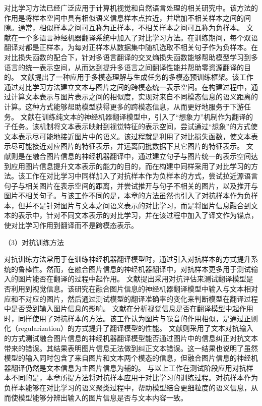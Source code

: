对比学习方法已经广泛应用于计算机视觉和自然语言处理的相关研究中。该方法的作用是将样本空间中具有相似语义信息样本点拉近，并增加不相关样本之间的间隙。通常，相似样本之间可互称为正样本，不相关样本之间可互称为负样本。
文献\cite{70_pan-etal-2021-contrastive}在一个多语言神经机器翻译系统中加入了对比学习方法。在训练期间，每个双语翻译对都是正样本，为每对正样本从数据集中随机选取不相关句子作为负样本。在对比损失函数的配合下，针对多语言翻译的交叉熵损失函数能够帮助模型学习到多语言的统一表示空间，从而达到提升多语言之间翻译性能并帮助零资源翻译的目的。
文献\cite{80_li-etal-2021-unimo}提出了一种应用于多模态理解与生成任务的多模态预训练框架。该工作通过对比学习方法建立文本与图片之间的跨模态统一表示空间。在构建过程中，通过计算文本表示与图片表示之间的相似度，实现对来自不同模态信息的语义距离的计算。这种方式能够帮助模型获得更多的跨模态信息，从而更好地服务于下游任务。
文献\cite{37_elliott-kadar-2017-imagination}在训练纯文本的神经机器翻译模型中，引入了“想象力”机制作为翻译的子任务。该机制将文本表示映射到视觉特征的表示空间，尝试通过“想象”的方式使文本表示尽可能地接近图片中的语义。该过程就是利用了对比损失函数，使文本表示尽可能接近对应图片的特征表示，并远离同批数据下其它图片的特征表示。
文献\cite{68_DBLP:journals/corr/KirosSZ14}则是在融合图片信息的神经机器翻译中，通过建立句子与图片统一的表示空间达到应用图片信息提升文本表示的能力的目的，而在构建中同样采用了对比学习的方法。该工作在对比学习中同样加入了对抗样本作为负样本的方式，尝试拉近源语言句子与相关图片在表示空间的距离，并尝试推开与句子不相关的图片，以及推开与图片不相关句子。与该工作不同的是，本章的方法虽然也引入了对抗样本作为负样本，但并不是针对图片与文本之间语义表示的对比学习，而是将图片信息融合到文本的表示中，针对不同文本表示的对比学习，并在该过程中加入了译文作为锚点，使对比学习作用到翻译而不是跨模态表示。

{\sffamily （3）对抗训练方法}

对抗训练方法常用于在训练神经机器翻译模型时，通过引入对抗样本的方式提升系统的鲁棒性。然而，在融合图片信息的神经机器翻译中，对抗样本更多用于测试输入的图片能否在翻译的过程中起作用。
文献\cite{23_elliott-2018-adversarial}提出采用对抗评估来测试翻译模型是否利用到视觉信息。该研究在融合图片信息的神经机器翻译模型中输入与文本相对应和不对应的图片，然后通过测试模型的翻译准确率的变化来判断模型在翻译过程中是否受到输入图片信息的影响。
文献\cite{20_wu-etal-2021-good,22_li-etal-2021-vision}在分析视觉信息是否在翻译模型中起作用时，同样使用了对抗样本的方法。该工作认为图片与噪音的作用相似，是通过正则化（regularization）的方式提升了翻译模型的性能。
文献\cite{23_elliott-2018-adversarial}则采用了文本对抗输入的方式测试融合图片信息的神经机器翻译模型能否通过图片中的信息纠正对抗文本带来的错误。其结果表明图片信息无法做到纠正文本错误。这一结果也说明了虽然模型的输入同时包含了来自图片和文本两个模态的信息，但融合图片信息的神经机器翻译仍然是文本信息为主图片信息为辅的。
与以上工作在测试阶段应用对抗样本不同的是，本章所提方法将对抗样本应用于对比学习的训练过程。对抗样本作为负样本能够在对比学习的语义聚类过程中，帮助模型结合更细粒度的语义信息，从而使模型能够分辨出输入的图片信息是否与文本内容一致。